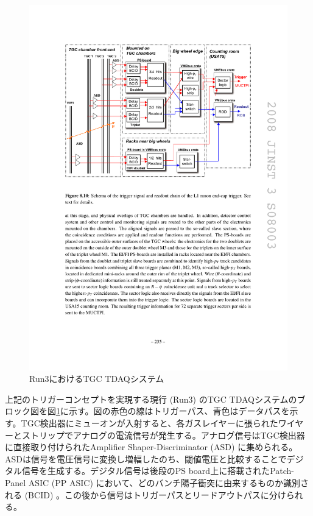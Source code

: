\begin{figure} 
\centering
\includegraphics[width=16cm]{fig/Intro/TGC_run3tdaq.pdf}
\caption[Run3におけるTGC TDAQシステム]{Run3におけるTGC TDAQシステム}
\label{TGC_run3tdaq}
\end{figure}

上記のトリガーコンセプトを実現する現行 (Run3) のTGC TDAQシステムのブロック図を図\ref{TGC_run3tdaq}に示す。図の赤色の線はトリガーパス、青色はデータパスを示す。TGC検出器にミューオンが入射すると、各ガスレイヤーに張られたワイヤーとストリップでアナログの電流信号が発生する。アナログ信号はTGC検出器に直接取り付けられたAmplifier Shaper-Discriminator  (ASD) に集められる。ASDは信号を電圧信号に変換し増幅したのち、閾値電圧と比較することでデジタル信号を生成する。デジタル信号は後段のPS board上に搭載されたPatch-Panel ASIC  (PP ASIC) において、どのバンチ陽子衝突に由来するものか識別される  (BCID) 。この後から信号はトリガーパスとリードアウトパスに分けられる。

